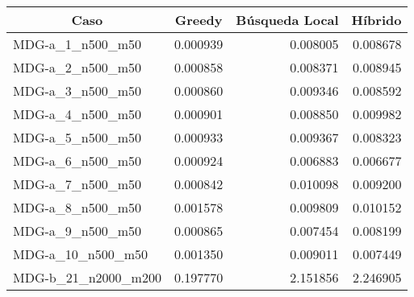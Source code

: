 \documentclass[10pt,a4paper]{article}
\begin{document}
\begin{table}[]
	\centering
	\begin{tabular}{|l|r|r|r|}
		\hline
		\multicolumn{1}{|c|}{\textbf{Caso}} & \multicolumn{1}{c|}{\textbf{Greedy}} & \multicolumn{1}{c|}{\textbf{Búsqueda Local}} & \multicolumn{1}{c|}{\textbf{Híbrido}} \\ \hline
		MDG-a\_1\_n500\_m50                 & 0.000939                             & 0.008005                                     & 0.008678                              \\ \hline
		MDG-a\_2\_n500\_m50                 & 0.000858                             & 0.008371                                     & 0.008945                              \\ \hline
		MDG-a\_3\_n500\_m50                 & 0.000860                             & 0.009346                                     & 0.008592                              \\ \hline
		MDG-a\_4\_n500\_m50                 & 0.000901                             & 0.008850                                     & 0.009982                              \\ \hline
		MDG-a\_5\_n500\_m50                 & 0.000933                             & 0.009367                                     & 0.008323                              \\ \hline
		MDG-a\_6\_n500\_m50                 & 0.000924                             & 0.006883                                     & 0.006677                              \\ \hline
		MDG-a\_7\_n500\_m50                 & 0.000842                             & 0.010098                                     & 0.009200                              \\ \hline
		MDG-a\_8\_n500\_m50                 & 0.001578                             & 0.009809                                     & 0.010152                              \\ \hline
		MDG-a\_9\_n500\_m50                 & 0.000865                             & 0.007454                                     & 0.008199                              \\ \hline
		MDG-a\_10\_n500\_m50                & 0.001350                             & 0.009011                                     & 0.007449                              \\ \hline
		MDG-b\_21\_n2000\_m200              & 0.197770                             & 2.151856                                     & 2.246905                              \\ \hline

\end{tabular}
\end{table}
\end{document}
